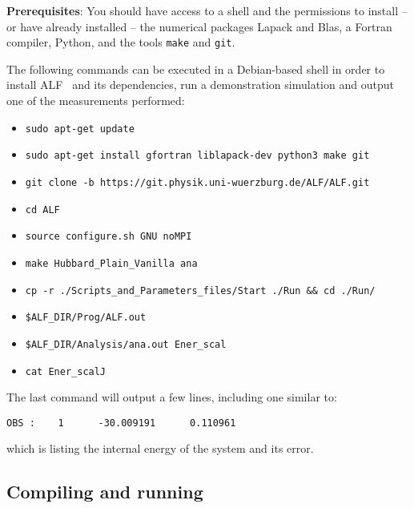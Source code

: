 \textbf{Prerequisites}:
You should have access to a shell and the permissions to install -- or have already installed -- the numerical packages Lapack and Blas, a Fortran compiler, Python, and the tools \texttt{make} and \texttt{git}. 

The following commands can be executed in a Debian-based shell in order to install ALF~\ALFver{} and its dependencies, run a demonstration simulation and output one of the measurements performed:
\begin{itemize}[itemsep=0pt]
	\item \lstinline[style=bash,morekeywords={sudo}]{sudo apt-get update}
	\item \lstinline[style=bash,morekeywords={sudo}]{sudo apt-get install gfortran liblapack-dev python3 make git}
	\item \lstinline[style=bash]{git clone -b }\texttt{\ALFbranch}\lstinline[style=bash]{https://git.physik.uni-wuerzburg.de/ALF/ALF.git}
	\item \lstinline[style=bash,morekeywords={cd}]{cd ALF}
	\item \lstinline[style=bash,morekeywords={source}]{source configure.sh GNU noMPI}
	\item \lstinline[style=bash,morekeywords={make}]{make Hubbard_Plain_Vanilla ana}
	\item \lstinline[style=bash,morekeywords={cp}]{cp -r ./Scripts_and_Parameters_files/Start ./Run && cd ./Run/}
	\item \lstinline[style=bash,morekeywords={}]{$ALF_DIR/Prog/ALF.out}
	\item \lstinline[style=bash,morekeywords={}]{$ALF_DIR/Analysis/ana.out Ener_scal}
	\item \lstinline[style=bash,morekeywords={}]{cat Ener_scalJ}
\end{itemize}
The last command will output a few lines, including one similar to:
\begin{lstlisting}[style=bash]
OBS :    1      -30.009191      0.110961
\end{lstlisting}
which is listing the internal energy of the system and its error.

\subsection{Compiling and running}
\label{sec:compilation}

